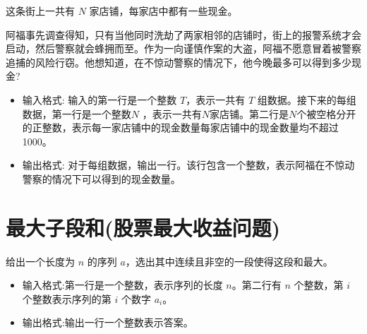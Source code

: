 \documentclass[11pt]{exam-zh}
\begin{document}
这条街上一共有 $N$ 家店铺，每家店中都有一些现金。

阿福事先调查得知，只有当他同时洗劫了两家相邻的店铺时，街上的报警系统才会启动，然后警察就会蜂拥而至。作为一向谨慎作案的大盗，阿福不愿意冒着被警察追捕的风险行窃。他想知道，在不惊动警察的情况下，他今晚最多可以得到多少现金?

\begin{itemize}
	\item 输入格式:	输入的第一行是一个整数 $T$，表示一共有 $T$ 组数据。接下来的每组数据，第一行是一个整数$N$ ，表示一共有$N$家店铺。第二行是$N$个被空格分开的正整数，表示每一家店铺中的现金数量每家店铺中的现金数量均不超过1000。
	\item 输出格式:	对于每组数据，输出一行。该行包含一个整数，表示阿福在不惊动警察的情况下可以得到的现金数量。
\end{itemize}

\begin{center}
	
	
\end{center}

\section{最大子段和(股票最大收益问题)}

给出一个长度为 $n$ 的序列 $a$，选出其中连续且非空的一段使得这段和最大。

\begin{itemize}
	
	\item 输入格式:第一行是一个整数，表示序列的长度 $n$。第二行有 $n$ 个整数，第 $i$ 个整数表示序列的第 $i$ 个数字 $a_i$。
	
	\item 输出格式:输出一行一个整数表示答案。
	
\end{itemize}

\begin{center}
	
	
\end{center}






\label{LastPage}
\end{document}
